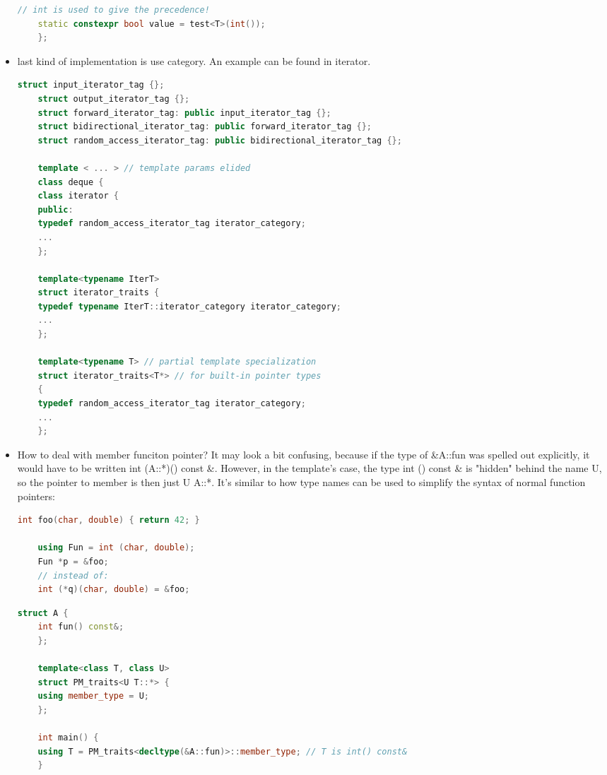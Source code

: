 \documentclass[a4paper,12pt,twoside]{book}
\begin{document}
\begin{itemize}
\begin{lstlisting}[frame=single, language=c++]
	// int is used to give the precedence!
	static constexpr bool value = test<T>(int());
	};
	\end{lstlisting}
	
	\item last kind of implementation is use category. An example can be found in iterator.
	
	\begin{lstlisting}[frame=single, language=c++]
	struct input_iterator_tag {};
	struct output_iterator_tag {};
	struct forward_iterator_tag: public input_iterator_tag {};
	struct bidirectional_iterator_tag: public forward_iterator_tag {};
	struct random_access_iterator_tag: public bidirectional_iterator_tag {};
	
	template < ... > // template params elided
	class deque {
	class iterator {
	public:
	typedef random_access_iterator_tag iterator_category;
	...
	};
	
	template<typename IterT>
	struct iterator_traits {
	typedef typename IterT::iterator_category iterator_category;
	...
	};
	
	template<typename T> // partial template specialization
	struct iterator_traits<T*> // for built-in pointer types
	{
	typedef random_access_iterator_tag iterator_category;
	...
	};
	\end{lstlisting}
	
	
	\item How to deal with member funciton pointer? It may look a bit confusing, because if the type of \&A::fun was spelled out explicitly, it would have to be written int (A::*)() const \&. However, in the template's case, the type int () const \& is "hidden" behind the name U, so the pointer to member is then just U A::*. It's similar to how type names can be used to simplify the syntax of normal function pointers:
	
	
	\begin{lstlisting}[frame=single, language=c++]
	int foo(char, double) { return 42; }
	
	using Fun = int (char, double);
	Fun *p = &foo;
	// instead of:
	int (*q)(char, double) = &foo;
	\end{lstlisting}
	
	\begin{lstlisting}[frame=single, language=c++]
	struct A {
	int fun() const&;
	};
	
	template<class T, class U>
	struct PM_traits<U T::*> {
	using member_type = U;
	};
	
	int main() {
	using T = PM_traits<decltype(&A::fun)>::member_type; // T is int() const&
	}
	

\end{lstlisting}
\end{itemize}
\end{document}
